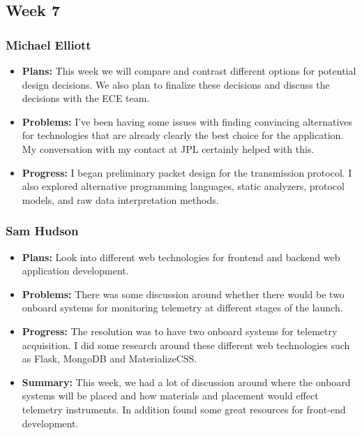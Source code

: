 \documentclass[onecolumn, draftclsnofoot,10pt, compsoc]{IEEEtran}
\begin{document}
\subsection {Week 7}
\subsubsection{Michael Elliott}
\begin {itemize}
\item \textbf{Plans: }
  This week we will compare and contrast different options for potential design decisions. We also plan to finalize these decisions and discuss the decisions with the ECE team.
\item \textbf{Problems: }
  I've been having some issues with finding convincing alternatives for technologies that are already clearly the best choice for the application. My conversation with my contact at JPL certainly helped with this.
\item \textbf{Progress: }
  I began preliminary packet design for the transmission protocol. I also explored alternative programming languages, static analyzers, protocol models, and raw data interpretation methods.
\end {itemize}
\subsubsection{Sam Hudson}
\begin {itemize}
\item \textbf{Plans: }Look into different web technologies for frontend and backend web application development.
\item \textbf{Problems: }There was some discussion around whether there would be two onboard systems for monitoring telemetry at different stages of the launch.
\item \textbf{Progress: } The resolution was to have two onboard systems for telemetry acquisition. I did some research around these different web technologies such as Flask, MongoDB and MaterializeCSS.
\item \textbf{Summary: }This week, we had a lot of discussion around where the onboard systems will be placed and how materials and placement would effect telemetry instruments. In addition found some great resources for front-end development.
\end {itemize}
\end{document}
